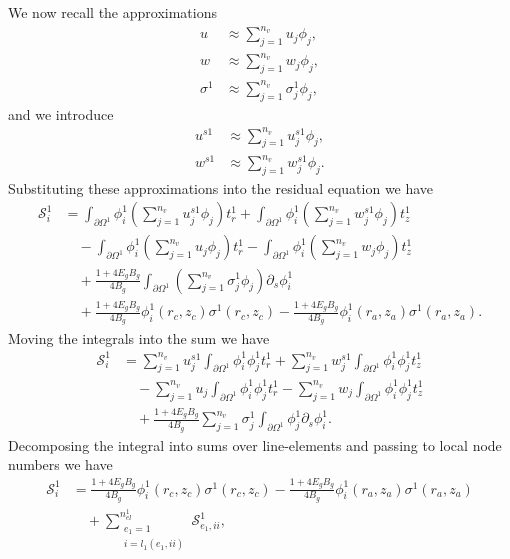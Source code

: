 \documentclass{article}
\begin{document}
We now recall the approximations
\begin{align}
u &\approx \sum_{j=1}^{n_v} u_j \phi_j, \tag{12.7} \\
w &\approx \sum_{j=1}^{n_v} w_j \phi_j, \tag{12.8} \\
\sigma^1 &\approx \sum_{j=1}^{n_v} \sigma_j^1 \phi_j, \tag{12.9}
\end{align}
and we introduce
\begin{align}
u^{s1} &\approx \sum_{j=1}^{n_v} u_j^{s1} \phi_j, \tag{12.10} \\
w^{s1} &\approx \sum_{j=1}^{n_v} w_j^{s1} \phi_j. \tag{12.11}
\end{align}
Substituting these approximations into the residual equation we have
\begin{align}
\mathcal{S}_i^1 &= \int_{\partial \Omega^{1}} \phi_i^1 \left( \sum_{j=1}^{n_v} u_j^{s1} \phi_j \right) t_r^1 + \int_{\partial \Omega^{1}} \phi_i^1 \left( \sum_{j=1}^{n_v} w_j^{s1} \phi_j \right) t_z^1 \nonumber\\
&\quad - \int_{\partial \Omega^{1}} \phi_i^1 \left( \sum_{j=1}^{n_v} u_j \phi_j \right) t_r^1 - \int_{\partial \Omega^{1}} \phi_i^1 \left( \sum_{j=1}^{n_v} w_j \phi_j \right) t_z^1 \nonumber\\
&\quad + \frac{1 + 4 E_g B_g}{4 B_g} \int_{\partial \Omega^{1}} \left( \sum_{j=1}^{n_v} \sigma_j^1 \phi_j \right) \partial_s \phi_i^1 \nonumber\\
&\quad + \frac{1 + 4 E_g B_g}{4 B_g} \phi_i^1(r_c,z_c) \sigma^1(r_c,z_c) - \frac{1 + 4 E_g B_g}{4 B_g} \phi_i^1(r_a,z_a) \sigma^1(r_a,z_a). \tag{12.12}
\end{align}
Moving the integrals into the sum we have
\begin{align}
\mathcal{S}_i^1 &= \sum_{j=1}^{n_v} u_j^{s1} \int_{\partial \Omega^{1}} \phi_i^1 \phi_j^1 t_r^1 + \sum_{j=1}^{n_v} w_j^{s1} \int_{\partial \Omega^{1}} \phi_i^1 \phi_j^1 t_z^1 \nonumber\\
&\quad - \sum_{j=1}^{n_v} u_j \int_{\partial \Omega^{1}} \phi_i^1 \phi_j^1 t_r^1 - \sum_{j=1}^{n_v} w_j \int_{\partial \Omega^{1}} \phi_i^1 \phi_j^1 t_z^1 \nonumber\\
&\quad + \frac{1 + 4 E_g B_g}{4 B_g} \sum_{j=1}^{n_v} \sigma_j^1 \int_{\partial \Omega^{1}} \phi_j^1 \partial_s \phi_i^1. \tag{12.13}
\end{align}
Decomposing the integral into sums over line-elements and passing to local node numbers we have
\begin{align}
\mathcal{S}_i^1 &= \frac{1 + 4 E_g B_g}{4 B_g} \phi_i^1(r_c,z_c) \sigma^1(r_c,z_c) - \frac{1 + 4 E_g B_g}{4 B_g} \phi_i^1(r_a,z_a) \sigma^1(r_a,z_a) \nonumber\\
&\quad + \sum_{\substack{e_1=1\\ i=l_1(e_1,ii)}}^{n_{el}^1} \mathcal{S}_{e_1,ii}^1, \tag{12.14}
\end{align}
\end{document}
